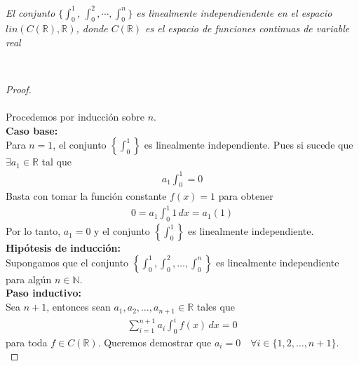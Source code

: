 \documentclass[11pt,letterpaper]{article}
\newcommand{\R}{\mathbb{R}}
\newcommand{\N}{\mathbb{N}}
\begin{document}
\begin{tcolorbox}[
	title = \textcolor{black}{\textcolor{white}{Problema 15}},]
\textit{El conjunto $\{\int_{0}^1,\,\int_{0}^2,\cdots,\int_0^n\}$ es linealmente independiendente
en el espacio $lin(C(\R),\R)$, donde $C(\R)$ es el espacio de funciones continuas de variable real
}
\end{tcolorbox}\,\\
\begin{proof}\,\\
    \,\\
    Procedemos por inducción sobre $n$.\\ [10pt]
    \textbf{Caso base:}\\ [10pt]
    Para $n = 1$, el conjunto $\left\{ \int_0^1 \right\}$ es linealmente independiente. Pues si sucede que
    $\exists a_1\in\R$ tal que \\ [10pt]
    \begin{align*}
        a_1\int_0^1 = 0
    \end{align*}
    Basta con tomar la función constante $f(x) = 1$ para obtener
    \begin{align*}
       0= a_1\int_0^1 1 \, dx = a_1(1)
    \end{align*}
    Por lo tanto, $a_1 = 0$ y el conjunto $\left\{ \int_0^1 \right\}$ es linealmente independiente.\\ [10pt]
    \textbf{Hipótesis de inducción:}\\ [10pt]
    Supongamos que el conjunto $\left\{ \int_0^1, \int_0^2, \dots, \int_0^n \right\}$ es linealmente independiente para algún $n \in \N$.\\ [10pt]
    \textbf{Paso inductivo:}\\ [10pt]
    Sea $n + 1$, entonces sean $a_1, a_2, \dots, a_{n+1} \in \R$ tales que
    \begin{align*}
        \sum_{i=1}^{n+1} a_i \int_0^i f(x) \, dx = 0
    \end{align*}
    para toda $f \in C(\R)$. Queremos demostrar que $a_i = 0 \quad \forall i \in \{1, 2, \dots, n+1\}$.\\ [10pt]

\end{proof}
\end{document}
